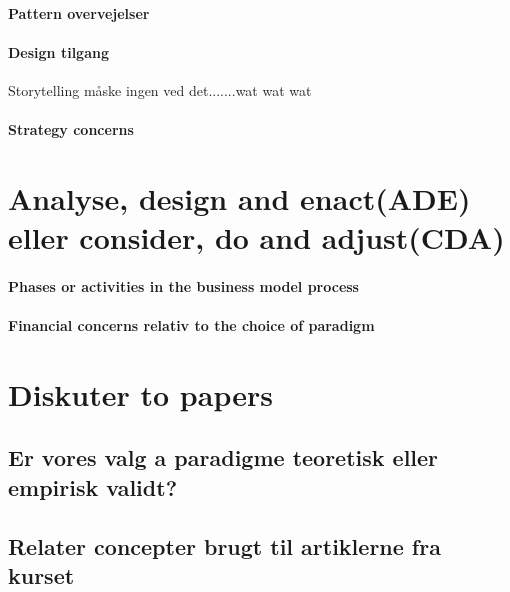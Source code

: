 \documentclass[a4paper]{article}
\begin{document}
\paragraph{Pattern overvejelser}

\paragraph{Design tilgang}
Storytelling måske ingen ved det.......wat wat wat

\paragraph{Strategy concerns}

\section{Analyse, design and enact(ADE) eller consider, do and adjust(CDA)}
\paragraph{Phases or activities in the business model process}
\paragraph{Financial concerns relativ to the choice of paradigm}

\section{Diskuter to papers}
\subsection{Er vores valg a paradigme teoretisk eller empirisk validt?}
\subsection{Relater concepter brugt til artiklerne fra kurset}

\printbibliography[heading=bibintoc]
\end{document}
